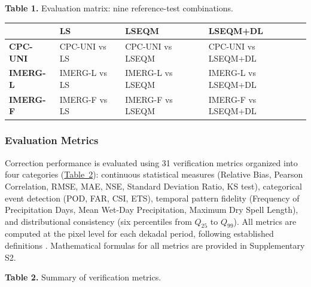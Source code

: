 \documentclass[11pt,a4paper]{article}
\begin{document}
\label{tab:1}
\textbf{Table 1.} Evaluation matrix: nine reference-test combinations.

\begingroup\small
\begin{longtable}[]{@{}llll@{}}
\toprule
& \textbf{LS} & \textbf{LSEQM} & \textbf{LSEQM+DL} \\
\midrule
\endhead
\bottomrule
\endlastfoot
\textbf{CPC-UNI} & CPC-UNI vs LS & CPC-UNI vs LSEQM & CPC-UNI vs
LSEQM+DL \\
\textbf{IMERG-L} & IMERG-L vs LS & IMERG-L vs LSEQM & IMERG-L vs
LSEQM+DL \\
\textbf{IMERG-F} & IMERG-F vs LS & IMERG-F vs LSEQM & IMERG-F vs
LSEQM+DL \\
\end{longtable}
\endgroup

\subsubsection{Evaluation Metrics}\label{evaluation-metrics}

Correction performance is evaluated using 31 verification metrics organized into four categories (\hyperref[tab:2]{Table~2}): continuous statistical measures (Relative Bias, Pearson Correlation, RMSE, MAE, NSE, Standard Deviation Ratio, KS test), categorical event detection (POD, FAR, CSI, ETS), temporal pattern fidelity (Frequency of Precipitation Days, Mean Wet-Day Precipitation, Maximum Dry Spell Length), and distributional consistency (six percentiles from \(Q_{25}\) to \(Q_{99}\)). All metrics are computed at the pixel level for each dekadal period, following established definitions \cite{ref14,ref15,ref28,ref29}. Mathematical formulas for all metrics are provided in Supplementary S2.

\label{tab:2}
\textbf{Table 2.} Summary of verification metrics.
\end{document}
